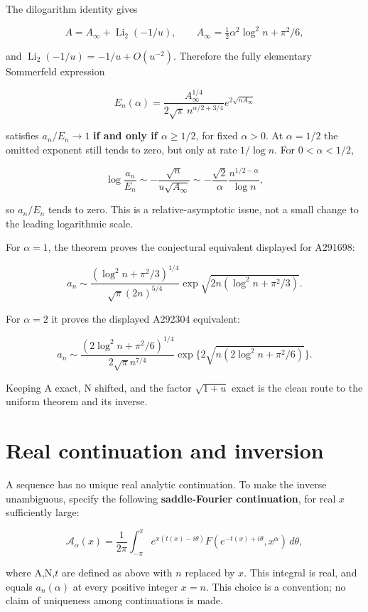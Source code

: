 \documentclass[11pt,letterpaper]{article}
\begin{document}
The dilogarithm identity gives

\[
 A=A_\infty+\operatorname{Li}_2(-1/u),\qquad
 A_\infty=\tfrac12\alpha^2\log^2n+\pi^2/6,
\]

and \(\operatorname{Li}_2(-1/u)=-1/u+O(u^{-2})\). Therefore the fully
elementary Sommerfeld expression

\[
 E_n(\alpha)=\frac{A_\infty^{1/4}}{2\sqrt\pi\,n^{\alpha/2+3/4}}
 e^{2\sqrt{nA_\infty}}
\]

satisfies \(a_n/E_n\to1\) \textbf{if and only if \(\alpha\ge1/2\)}, for
fixed \(\alpha>0\). At \(\alpha=1/2\) the omitted exponent still tends
to zero, but only at rate \(1/\log n\). For \(0<\alpha<1/2\),

\[
 \log\frac{a_n}{E_n}
 \sim-\frac{\sqrt n}{u\sqrt{A_\infty}}
 \sim-\frac{\sqrt2}{\alpha}\frac{n^{1/2-\alpha}}{\log n},
\]

so \(a_n/E_n\) tends to zero. This is a relative-asymptotic issue, not a
small change to the leading logarithmic scale.

For \(\alpha=1\), the theorem proves the conjectural equivalent
displayed for A291698:

\[
 a_n\sim\frac{(\log^2n+\pi^2/3)^{1/4}}
 {\sqrt\pi(2n)^{5/4}}
 \exp\sqrt{2n(\log^2n+\pi^2/3)}.
\]

For \(\alpha=2\) it proves the displayed A292304 equivalent:

\[
 a_n\sim\frac{(2\log^2n+\pi^2/6)^{1/4}}{2\sqrt\pi n^{7/4}}
 \exp\{2\sqrt{n(2\log^2n+\pi^2/6)}\}.
\]

Keeping A exact, N shifted, and the factor \(\sqrt{1+u}\) exact is the
clean route to the uniform theorem and its inverse.

\section{Real continuation and
inversion}\label{mfp:real-continuation-and-inversion}

A sequence has no unique real analytic continuation. To make the inverse
unambiguous, specify the following \textbf{saddle-Fourier continuation},
for real \(x\) sufficiently large:

\[
 \mathcal A_\alpha(x)=\frac1{2\pi}
 \int_{-\pi}^{\pi}e^{x(t(x)-i\theta)}
 F(e^{-t(x)+i\theta},x^\alpha)\,d\theta, \tag{13}
\]

where A,N,\(t\) are defined as above with \(n\) replaced by \(x\). This
integral is real, and equals \(a_n(\alpha)\) at every positive integer
\(x=n\). This choice is a convention; no claim of uniqueness among
continuations is made.
\end{document}
